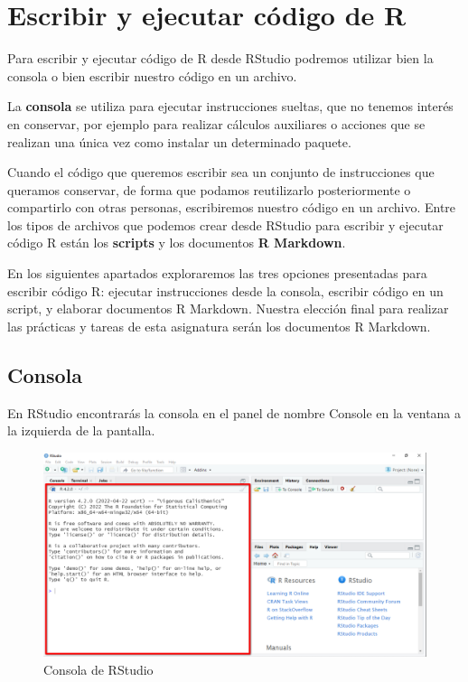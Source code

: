 \documentclass[
  title=normal,
  notoc,
  bib=normal]{mnye}
\begin{document}
\hypertarget{rmarkdown}{%
\section{Escribir y ejecutar código de R}\label{rmarkdown}}

Para escribir y ejecutar código de \textsf{R} desde \textsf{RStudio} podremos utilizar bien la consola o bien escribir nuestro código en un archivo.

La \textbf{consola} se utiliza para ejecutar instrucciones sueltas, que no tenemos interés en conservar, por ejemplo para realizar cálculos auxiliares o acciones que se realizan una única vez como instalar un determinado paquete.

Cuando el código que queremos escribir sea un conjunto de instrucciones que queramos conservar, de forma que podamos reutilizarlo posteriormente o compartirlo con otras personas, escribiremos nuestro código en un archivo.
Entre los tipos de archivos que podemos crear desde \textsf{RStudio} para escribir y ejecutar código \textsf{R} están los \textbf{scripts} y los documentos \textbf{R Markdown}.

En los siguientes apartados exploraremos las tres opciones presentadas para escribir código \textsf{R}: ejecutar instrucciones desde la consola, escribir código en un script, y elaborar documentos R Markdown. Nuestra elección final para realizar las prácticas y tareas de esta asignatura serán los documentos R Markdown.

\hypertarget{consola}{%
\subsection{Consola}\label{consola}}

En \textsf{RStudio} encontrarás la consola en el panel de nombre \textsf{Console} en la ventana a la izquierda de la pantalla.

\begin{figure}

{\centering \includegraphics[width=1\linewidth]{images/rstudio-console} 

}

\caption{Consola de RStudio}\label{fig:unnamed-chunk-5}
\end{figure}
\end{document}
